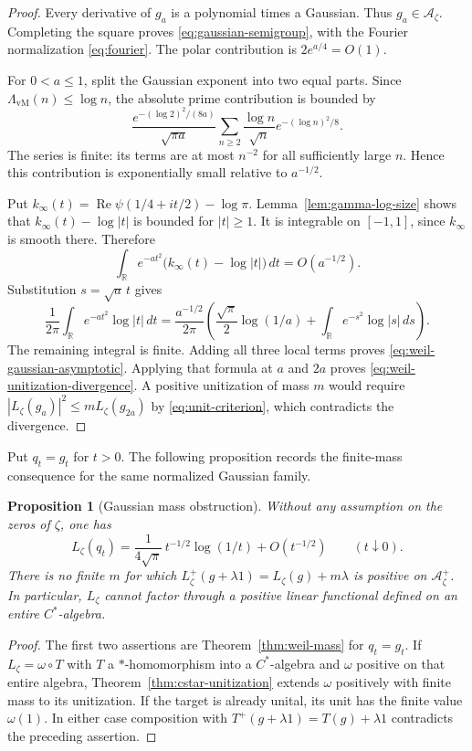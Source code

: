 \documentclass[11pt]{article}
\newtheorem{proposition}[theorem]{Proposition}
\theoremstyle{definition}
\theoremstyle{remark}
\numberwithin{equation}{section}
\newcommand{\cA}{\mathcal A}
\newcommand{\R}{\mathbb R}
\begin{document}
\begin{proof}
Every derivative of $g_a$ is a polynomial times a Gaussian.
Thus $g_a\in\cA_\zeta$.  Completing the square proves
\eqref{eq:gaussian-semigroup}, with the Fourier normalization
\eqref{eq:fourier}.
The polar contribution is $2e^{a/4}=O(1)$.

For $0<a\leq1$, split the Gaussian exponent into two equal parts.
Since $\Lambda_{\mathrm{vM}}(n)\leq\log n$, the absolute prime contribution
is bounded by
\begin{equation}
 \frac{e^{-(\log2)^2/(8a)}}{\sqrt{\pi a}}
 \sum_{n\geq2}\frac{\log n}{\sqrt n}
                       e^{-(\log n)^2/8}.
 \label{eq:prime-gaussian-bound}
\end{equation}
The series is finite: its terms are at most $n^{-2}$ for all sufficiently
large $n$.  Hence this contribution is exponentially small relative to
$a^{-1/2}$.

Put $k_\infty(t)=\operatorname{Re}\psi(1/4+it/2)-\log\pi$.
Lemma~\ref{lem:gamma-log-size} shows that
$k_\infty(t)-\log|t|$ is bounded for $|t|\geq1$.
It is integrable on $[-1,1]$, since $k_\infty$ is smooth there.
Therefore
\[
 \int_{\R}e^{-at^2}\bigl(k_\infty(t)-\log|t|\bigr)\,dt
 =O(a^{-1/2}).
\]
Substitution $s=\sqrt a\,t$ gives
\[
 \frac1{2\pi}\int_{\R}e^{-at^2}\log|t|\,dt
 =\frac{a^{-1/2}}{2\pi}
 \left(\frac{\sqrt\pi}{2}\log(1/a)
          +\int_{\R}e^{-s^2}\log|s|\,ds\right).
\]
The remaining integral is finite.  Adding all three local terms proves
\eqref{eq:weil-gaussian-asymptotic}.
Applying that formula at $a$ and $2a$ proves
\eqref{eq:weil-unitization-divergence}.
A positive unitization of mass $m$ would require
$|L_\zeta(g_a)|^2\leq mL_\zeta(g_{2a})$ by
\eqref{eq:unit-criterion}, which contradicts the divergence.
\end{proof}


Put $q_t=g_t$ for $t>0$.  The following proposition records the
finite-mass consequence for the same normalized Gaussian family.
\begin{proposition}[Gaussian mass obstruction]
\label{prop:gaussian-mass}
Without any assumption on the zeros of $\zeta$, one has
\[
 L_\zeta(q_t)=\frac{1}{4\sqrt\pi}\,t^{-1/2}\log(1/t)
                  +O(t^{-1/2})\qquad(t\downarrow0).
\]
There is no finite $m$ for which
$L_\zeta^+(g+\lambda1)=L_\zeta(g)+m\lambda$ is positive on
$\cA_\zeta^+$.  In particular, $L_\zeta$ cannot factor through a
positive linear functional defined on an entire $C^*$-algebra.
\end{proposition}
\begin{proof}
The first two assertions are Theorem~\ref{thm:weil-mass} for $q_t=g_t$.
If $L_\zeta=\omega\circ T$ with $T$ a $*$-homomorphism into a
$C^*$-algebra and $\omega$ positive on that entire algebra,
Theorem~\ref{thm:cstar-unitization} extends $\omega$ positively with
finite mass to its unitization.  If the target is already unital, its
unit has the finite value $\omega(1)$.  In either case composition
with $T^+(g+\lambda1)=T(g)+\lambda1$ contradicts the preceding assertion.
\end{proof}
\end{document}
